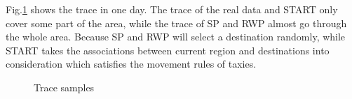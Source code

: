 Fig.\ref{figure_tracesample} shows the trace in one day. The trace of the real data and START only cover some part of the area, while the trace of SP and RWP almost go through the whole area. Because SP and RWP will select a destination randomly, while START takes the associations between current region and destinations into consideration which satisfies the movement rules of taxies. 
\begin{figure}
\centering
{}
\caption{Trace samples}\label{figure_tracesample}
\end{figure}


